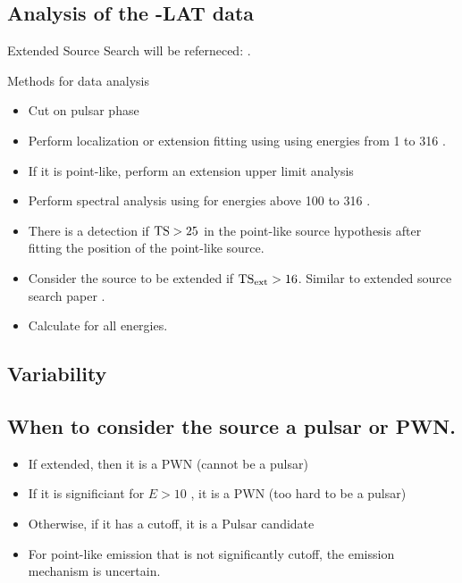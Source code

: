 \subsection{Analysis of the \fermi-LAT data}

Extended Source Search will be referneced: \cite{extended_source_search}.

Methods for data analysis
\begin{itemize}
\item Cut on pulsar phase
\item Perform localization or extension fitting using \gtlike using energies from 1 \gev to 316 \gev.
\item If it is point-like, perform an extension upper limit analysis 
\item Perform spectral analysis using \gtlike for energies above 100 \mev to 316 \gev.
\item There is a detection if  $\text{TS}>25$ in the point-like source hypothesis after fitting the position of the point-like source. 
\item Consider the source to be extended if $\text{TS}_\text{ext}>16$. Similar to extended source search paper .
\item Calculate \tscut for all energies.
\end{itemize}

\subsection{Variability}

\subsection{When to consider the source a pulsar or PWN.}
\begin{itemize}
  \item If extended, then it is a PWN (cannot be a pulsar)
  \item If it is significiant for $E>10$ \gev, it is a PWN (too hard to be a pulsar)
  \item Otherwise, if it has a cutoff, it is a Pulsar candidate
  \item For point-like emission that is not significantly cutoff, the emission  mechanism is uncertain.
\end{itemize}
